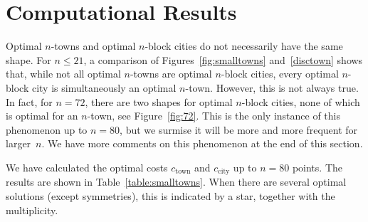 \documentclass[preprint,authoryear,12pt]{elsarticle}
\begin{document}
\section{Computational Results}
\label{sec:results}

Optimal $n$-towns and optimal $n$-block cities do not necessarily
have the same shape. For $n\le 21$, a comparison of
Figures~\ref{fig:smalltowns} and~\ref{disctown} shows that, while
not all optimal $n$-towns are optimal $n$-block cities, every
optimal $n$-block city is simultaneously an optimal $n$-town.
However, this is not always true. In fact, for $n=72$, there are two shapes for
 optimal $n$-block cities, none of which is optimal for an $n$-town,
see Figure~\ref{fig:72}.
This is the only instance of this phenomenon up to $n=80$, but we
surmise it will be more and more frequent for larger~$n$.
We have more comments on this phenomenon at the end of this section.


We have calculated the optimal costs
$c_{\textrm{town}}$ and
$c_{\textrm{city}}$ up to $n=80$ points. The results are shown in
Table~\ref{table:smalltowns}. When there are several optimal solutions
(except symmetries), this is indicated by a star,
together with the multiplicity.
\end{document}
